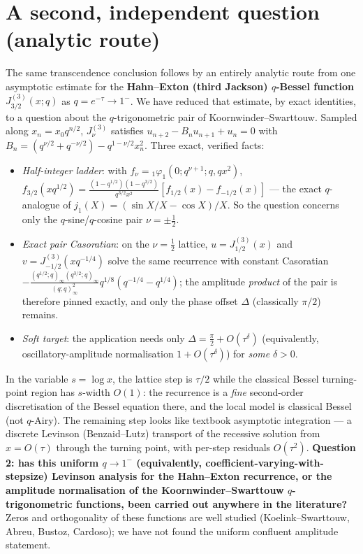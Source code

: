 \documentclass[11pt]{article}
\begin{document}
\section*{A second, independent question (analytic route)}

The same transcendence conclusion follows by an entirely analytic route from one asymptotic
estimate for the \textbf{Hahn--Exton (third Jackson) $q$-Bessel function} $J^{(3)}_{3/2}(x;q)$ as
$q=e^{-\tau}\to1^-$. We have reduced that estimate, by exact identities, to a question about the
$q$-trigonometric pair of Koornwinder--Swarttouw. Sampled along $x_n=x_0q^{n/2}$, $J^{(3)}_\nu$
satisfies $u_{n+2}-B_nu_{n+1}+u_n=0$ with $B_n=(q^{\nu/2}+q^{-\nu/2})-q^{1-\nu/2}x_n^2$. Three exact,
verified facts:
\begin{itemize}
\item \emph{Half-integer ladder}: with $f_\nu={}_1\varphi_1(0;q^{\nu+1};q,qx^2)$,
$f_{3/2}(xq^{1/2})=\tfrac{(1-q^{1/2})(1-q^{3/2})}{q^{3/2}x^2}[f_{1/2}(x)-f_{-1/2}(x)]$ --- the exact
$q$-analogue of $j_1(X)=(\sin X/X-\cos X)/X$. So the question concerns only the $q$-sine/$q$-cosine
pair $\nu=\pm\tfrac12$.
\item \emph{Exact pair Casoratian}: on the $\nu=\tfrac12$ lattice, $u=J^{(3)}_{1/2}(x)$ and
$v=J^{(3)}_{-1/2}(xq^{-1/4})$ solve the same recurrence with constant Casoratian
$-\tfrac{(q^{1/2};q)_\infty(q^{3/2};q)_\infty}{(q;q)_\infty^2}q^{1/8}(q^{-1/4}-q^{1/4})$; the
amplitude \emph{product} of the pair is therefore pinned exactly, and only the phase offset
$\Delta$ (classically $\pi/2$) remains.
\item \emph{Soft target}: the application needs only $\Delta=\tfrac\pi2+O(\tau^{\delta})$
(equivalently, oscillatory-amplitude normalisation $1+O(\tau^\delta)$) for \emph{some} $\delta>0.$
\end{itemize}
In the variable $s=\log x$, the lattice step is $\tau/2$ while the classical Bessel turning-point
region has $s$-width $O(1)$: the recurrence is a \emph{fine} second-order discretisation of the
Bessel equation there, and the local model is classical Bessel (not $q$-Airy). The remaining step
looks like textbook asymptotic integration --- a discrete Levinson (Benzaid--Lutz) transport of the
recessive solution from $x=O(\tau)$ through the turning point, with per-step residuals $O(\tau^2)$.
\textbf{Question 2: has this uniform $q\to1^-$ (equivalently, coefficient-varying-with-stepsize)
Levinson analysis for the Hahn--Exton recurrence, or the amplitude normalisation of the
Koornwinder--Swarttouw $q$-trigonometric functions, been carried out anywhere in the literature?}
Zeros and orthogonality of these functions are well studied (Koelink--Swarttouw, Abreu, Bustoz,
Cardoso); we have not found the uniform confluent amplitude statement.
\end{document}
